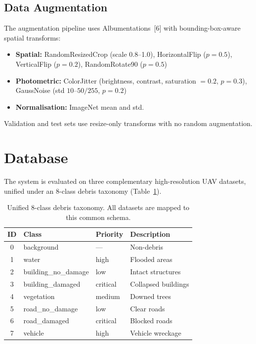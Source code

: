 \documentclass[10pt,a4paper,twocolumn]{article}
\begin{document}
\subsection{Data Augmentation}

The augmentation pipeline uses Albumentations~[6] with bounding-box-aware spatial transforms:

\begin{itemize}
  \item \textbf{Spatial:} RandomResizedCrop (scale 0.8--1.0), HorizontalFlip ($p{=}0.5$), VerticalFlip ($p{=}0.2$), RandomRotate90 ($p{=}0.5$)
  \item \textbf{Photometric:} ColorJitter (brightness, contrast, saturation $= 0.2$, $p{=}0.3$), GaussNoise (std $10$--$50/255$, $p{=}0.2$)
  \item \textbf{Normalisation:} ImageNet mean and std.
\end{itemize}

Validation and test sets use resize-only transforms with no random augmentation.

\section{Database}

The system is evaluated on three complementary high-resolution UAV datasets, unified under an 8-class debris taxonomy (Table~\ref{tab:taxonomy}).

\begin{table}[h]
\centering
\caption{Unified 8-class debris taxonomy. All datasets are mapped to this common schema.}
\label{tab:taxonomy}
\fontsize{8}{9.5}\selectfont
\begin{tabular}{clll}
\toprule
\textbf{ID} & \textbf{Class} & \textbf{Priority} & \textbf{Description} \\
\midrule
0 & background & --- & Non-debris \\
1 & water & high & Flooded areas \\
2 & building\_no\_damage & low & Intact structures \\
3 & building\_damaged & critical & Collapsed buildings \\
4 & vegetation & medium & Downed trees \\
5 & road\_no\_damage & low & Clear roads \\
6 & road\_damaged & critical & Blocked roads \\
7 & vehicle & high & Vehicle wreckage \\
\bottomrule
\end{tabular}
\end{table}
\end{document}

